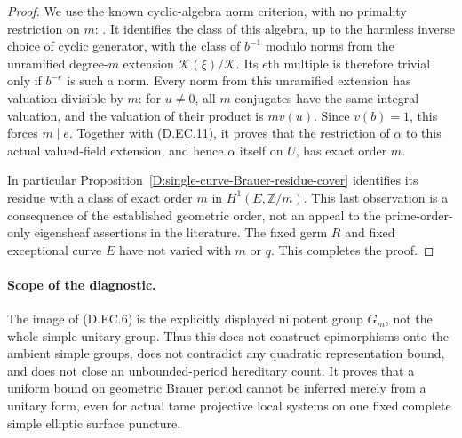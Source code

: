 \begin{proof}
We use the known cyclic-algebra norm criterion, with no
primality restriction on $m$:
\citet[Proposition~4.7.3 and Corollaries~4.7.4--4.7.5,
pp.~109--111]{D_GilleSzamuely2006Cone}.
It identifies the class of this algebra, up to the harmless
inverse choice of cyclic generator, with the class of
$b^{-1}$ modulo norms from the unramified degree-$m$
extension $\mathcal K(\xi)/\mathcal K$.
Its $e$th multiple is therefore trivial only if $b^{-e}$
is such a norm. Every norm from this unramified extension
has valuation divisible by $m$: for $u\ne0$, all $m$
conjugates have the same integral valuation, and the
valuation of their product is $m v(u)$.
Since $v(b)=1$, this forces $m\mid e$.
Together with (D.EC.11), it proves that the restriction of
$\alpha$ to this actual valued-field extension, and hence
$\alpha$ itself on $U$, has exact order $m$.

In particular Proposition~\ref{D:single-curve-Brauer-residue-cover}
identifies its residue with a class of exact order $m$ in
$H^1(E,\mathbb Z/m)$. This last observation is a consequence
of the established geometric order, not an appeal to the
prime-order-only eigensheaf assertions in the literature.
The fixed germ $R$ and fixed exceptional curve $E$ have
not varied with $m$ or $q$. This completes the proof.
\end{proof}

\paragraph{Scope of the diagnostic.}
The image of (D.EC.6) is the explicitly displayed nilpotent
group $G_m$, not the whole simple unitary group. Thus this
does not construct epimorphisms onto the ambient simple
groups, does not contradict any quadratic representation
bound, and does not close an unbounded-period hereditary
count. It proves that a uniform bound on geometric Brauer
period cannot be inferred merely from a unitary form,
even for actual tame projective local systems on one fixed
complete simple elliptic surface puncture.
